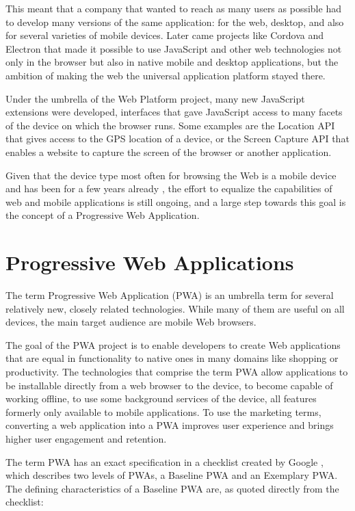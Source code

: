 \documentclass[english,odsaz]{fitthesis}
\begin{document}
This meant that a company that wanted to reach as many users as possible had to
develop many versions of the same application: for the web, desktop, and also
for several varieties of mobile devices. Later came projects like Cordova
and Electron that made it possible to use JavaScript and other web technologies
not only in the browser but also in native mobile and desktop applications, but
the ambition of making the web the universal application platform stayed there.

Under the umbrella of the Web Platform project, many new JavaScript extensions
were developed, interfaces that gave JavaScript access to many facets of the
device on which the browser runs. Some examples are the Location API that gives
access to the GPS location of a device, or the Screen Capture API that enables a
website to capture the screen of the browser or another application.

Given that the device type most often for browsing the Web is a mobile device
and has been for a few years already \cite{mobile-stats}, the effort to equalize
the capabilities of web and mobile applications is still ongoing, and a large
step towards this goal is the concept of a Progressive Web Application.

\section{Progressive Web Applications}
\label{sec:org97effd6}
The term Progressive Web Application (PWA) is an umbrella term for several relatively
new, closely related technologies. While many of them are useful on all devices,
the main target audience are mobile Web browsers.

The goal of the PWA project is to enable developers to create Web applications
that are equal in functionality to native ones in many domains like shopping or
productivity. The technologies that comprise the term PWA allow applications to
be installable directly from a web browser to the device, to become capable of
working offline, to use some background services of the device, all features
formerly only available to mobile applications. To use the marketing terms,
converting a web application into a PWA improves user experience and brings
higher user engagement and retention.

The term PWA has an exact specification in a checklist created by Google
\cite{pwa_checklist}, which describes two levels of PWAs, a Baseline PWA and an
Exemplary PWA. The defining characteristics of a Baseline PWA are, as quoted
directly from the checklist:
\end{document}

